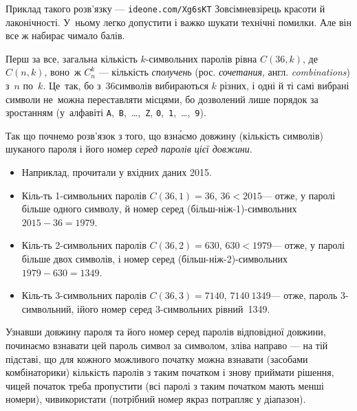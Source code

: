 Приклад такого розв’язку --- \verb"ideone.com/Xg6sKT"\hspace{0.5em plus 1em}%
Зовсім\nolinebreak[2] не\nolinebreak[3] взірець красоти й лаконічності. У~ньому легко допустити і важко шукати технічні помилки. Але він все ж набирає чимало балів.

Перш за все, загальна кількість $k$-сим\-воль\-них паролів рівна $C(36, k)$, де $C(n,k)$, воно~ж $C_n^k$ --- кількість \emph{сполучень} (рос. \emph{сочетания}, англ. \emph{combinations}) з~$n$ по~$k$. Це~так, бо з~36\nolinebreak[3] символів вибираються $k$ різних, і одні й ті самі вибрані символи не~можна переставляти місцями, бо дозволений лише порядок за зростанням (у~алфавіті \texttt{A},~\texttt{B},~\dots,~\texttt{Z}, \texttt{0},~\texttt{1},~\dots,~\texttt{9}).

Так що почнемо розв’язок з того, що взн\'{а}ємо довжину (кількість символів) шуканого пароля і його номер \emph{серед паролів цієї довжини}.

\begin{small}
\begin{itemize}[leftmargin=*,itemsep=0pt,partopsep=0pt,topsep=0pt,parsep=0pt]
\item[] Наприклад, прочитали у вхідних даних 2015.

\item Кіль-ть 1-символьних паролів ${C(36,1){=}36}$,\hspace{0.5em plus 1em} ${36{<}2015}$\nolinebreak[3] --- отже, у паролі більше одного символу, й номер серед (більш-ніж-1)-символьних ${2015-36=1979}$.

\item Кіль-ть 2-символьних паролів ${C(36,2){=}630}$,\hspace{0.5em plus 1em} ${630{<}1979}$\nolinebreak[3] --- отже, у паролі більше двох символів, і номер серед (більш-ніж-2)-символьних ${1979-630=1349}$.

\item Кіль-ть 3-символьних паролів ${C(36,3){=}7140}$,\hspace{0.5em plus 1em} ${7140{\>}1349}$\nolinebreak[3] --- отже, пароль 3-символьний, і\nolinebreak[3] його номер серед 3-символьних рівний~1349.

\end{itemize}
\end{small}

Узнавши довжину пароля та його номер серед паролів 
відповідної довжини, починаємо взнавати цей пароль символ за символом, зліва направо --- на тій підставі, що для кожного можливого початку можна взнавати (засобами комбінаторики) 
кількість паролів з таким початком і знову приймати рішення, чи\nolinebreak[3] цей початок треба пропустити (всі паролі з таким початком мають менші номери), чи\nolinebreak[3] використати (потрібний номер якраз потрапляє у діапазон).

